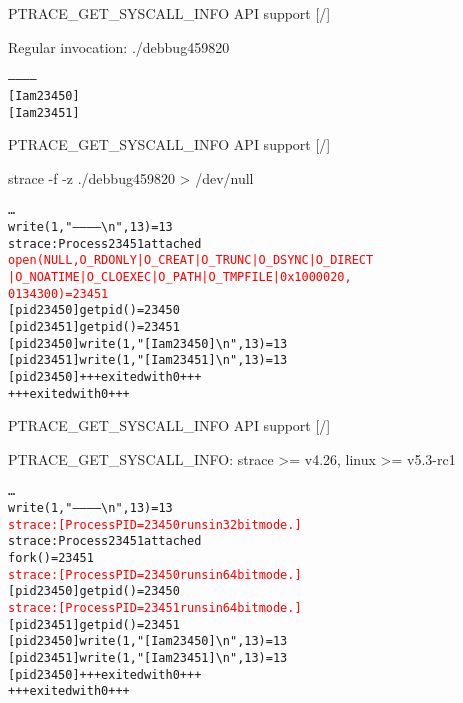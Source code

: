 \documentclass[unicode,aspectratio=169]{beamer}
\begin{document}
\begin{frame}[fragile]{PTRACE\_GET\_SYSCALL\_INFO API support \hfill [\insertframenumber/\inserttotalframenumber]}
\large
{}

\begin{block}{Regular invocation: ./debbug459820}
\begin{alltt}
------------
[I am 23450]
[I am 23451]
\end{alltt}
\end{block}
\end{frame}

\begin{frame}[fragile]{PTRACE\_GET\_SYSCALL\_INFO API support \hfill [\insertframenumber/\inserttotalframenumber]}
\Large
\begin{block}{strace -f -z ./debbug459820 > /dev/null}
\begin{alltt}
\ldots
write(1, "------------{\textbackslash}n", 13)          = 13
strace: Process 23451 attached
\textcolor{red}{open(NULL, O_RDONLY|O_CREAT|O_TRUNC|O_DSYNC|O_DIRECT
|O_NOATIME|O_CLOEXEC|O_PATH|O_TMPFILE|0x1000020,
0134300) = 23451}
[pid 23450] getpid()                    = 23450
[pid 23451] getpid()                    = 23451
[pid 23450] write(1, "[I am 23450]{\textbackslash}n", 13) = 13
[pid 23451] write(1, "[I am 23451]{\textbackslash}n", 13) = 13
[pid 23450] +++ exited with 0 +++
+++ exited with 0 +++
\end{alltt}
\end{block}
\end{frame}

\begin{frame}[fragile]{PTRACE\_GET\_SYSCALL\_INFO API support \hfill [\insertframenumber/\inserttotalframenumber]}
\large
\begin{block}{PTRACE\_GET\_SYSCALL\_INFO: strace >= v4.26, linux >= v5.3-rc1}
\begin{alltt}
\ldots
write(1, "------------{\textbackslash}n", 13)          = 13
\textcolor{red}{strace: [ Process PID=23450 runs in 32 bit mode. ]}
strace: Process 23451 attached
fork()                                  = 23451
\textcolor{red}{strace: [ Process PID=23450 runs in 64 bit mode. ]}
[pid 23450] getpid()                    = 23450
\textcolor{red}{strace: [ Process PID=23451 runs in 64 bit mode. ]}
[pid 23451] getpid()                    = 23451
[pid 23450] write(1, "[I am 23450]{\textbackslash}n", 13) = 13
[pid 23451] write(1, "[I am 23451]{\textbackslash}n", 13) = 13
[pid 23450] +++ exited with 0 +++
+++ exited with 0 +++
\end{alltt}
\end{block}
\end{frame}
\end{document}
